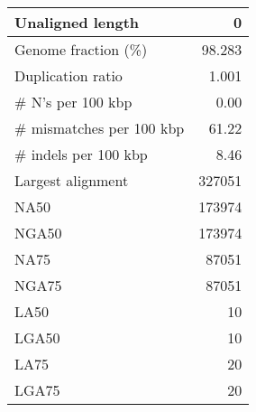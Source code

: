 \documentclass[12pt,a4paper]{article}
\begin{document}
\begin{table}[ht]
\begin{center}
\begin{tabular}{|l*{1}{|r}|}
Unaligned length & 0 \\ \hline
Genome fraction (\%) & 98.283 \\ \hline
Duplication ratio & 1.001 \\ \hline
\# N's per 100 kbp & 0.00 \\ \hline
\# mismatches per 100 kbp & 61.22 \\ \hline
\# indels per 100 kbp & 8.46 \\ \hline
Largest alignment & 327051 \\ \hline
NA50 & 173974 \\ \hline
NGA50 & 173974 \\ \hline
NA75 & 87051 \\ \hline
NGA75 & 87051 \\ \hline
LA50 & 10 \\ \hline
LGA50 & 10 \\ \hline
LA75 & 20 \\ \hline
LGA75 & 20 \\ \hline
\end{tabular}
\end{center}
\end{table}
\end{document}
